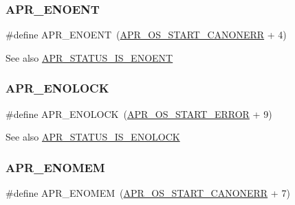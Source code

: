 \subsubsection{\texorpdfstring{A\+P\+R\+\_\+\+E\+N\+O\+E\+NT}{APR\_ENOENT}}
{\footnotesize\ttfamily \#define A\+P\+R\+\_\+\+E\+N\+O\+E\+NT~(\mbox{\hyperlink{group__apr__errno_ga7bca957c11b80b31cb54b0d2cbe9e025}{A\+P\+R\+\_\+\+O\+S\+\_\+\+S\+T\+A\+R\+T\+\_\+\+C\+A\+N\+O\+N\+E\+RR}} + 4)}

\begin{DoxySeeAlso}{See also}
\mbox{\hyperlink{group___a_p_r___s_t_a_t_u_s___i_s_gad15c3b9bda78a88c02466a0d405c6047}{A\+P\+R\+\_\+\+S\+T\+A\+T\+U\+S\+\_\+\+I\+S\+\_\+\+E\+N\+O\+E\+NT}} 
\end{DoxySeeAlso}
\mbox{\label{group___a_p_r___error_ga9c411624c42f7562a5c6c3461bdcb0ec}} 
\subsubsection{\texorpdfstring{A\+P\+R\+\_\+\+E\+N\+O\+L\+O\+CK}{APR\_ENOLOCK}}
{\footnotesize\ttfamily \#define A\+P\+R\+\_\+\+E\+N\+O\+L\+O\+CK~(\mbox{\hyperlink{group__apr__errno_ga191894048b7bd0cca3cf0bdff1eb695b}{A\+P\+R\+\_\+\+O\+S\+\_\+\+S\+T\+A\+R\+T\+\_\+\+E\+R\+R\+OR}} + 9)}

\begin{DoxySeeAlso}{See also}
\mbox{\hyperlink{group___a_p_r___s_t_a_t_u_s___i_s_gaced66cdb08529210dbf2f6bcbba99258}{A\+P\+R\+\_\+\+S\+T\+A\+T\+U\+S\+\_\+\+I\+S\+\_\+\+E\+N\+O\+L\+O\+CK}} 
\end{DoxySeeAlso}
\mbox{\label{group___a_p_r___error_ga6a453e60000000609a95817efabebf4f}} 
\subsubsection{\texorpdfstring{A\+P\+R\+\_\+\+E\+N\+O\+M\+EM}{APR\_ENOMEM}}
{\footnotesize\ttfamily \#define A\+P\+R\+\_\+\+E\+N\+O\+M\+EM~(\mbox{\hyperlink{group__apr__errno_ga7bca957c11b80b31cb54b0d2cbe9e025}{A\+P\+R\+\_\+\+O\+S\+\_\+\+S\+T\+A\+R\+T\+\_\+\+C\+A\+N\+O\+N\+E\+RR}} + 7)}

